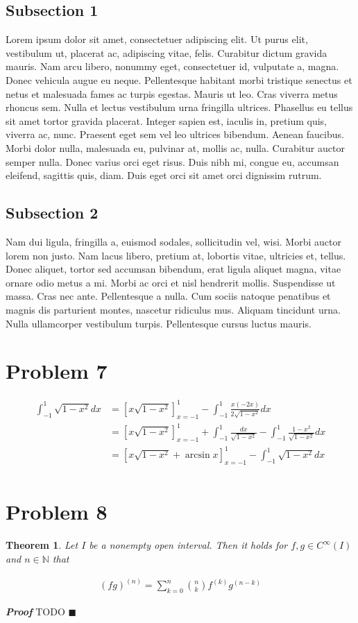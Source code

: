 \documentclass[12pt]{article}
\newtheorem{theorem}{Theorem}
\newenvironment{proof}{\textit{\textbf{Proof}}}{\hfill$\blacksquare$}
\begin{document}
\subsection{Subsection 1}
Lorem ipsum dolor sit amet, consectetuer
adipiscing elit. Ut purus elit, vestibulum ut, placerat ac,
adipiscing vitae, felis. Curabitur dictum gravida mauris. Nam arcu
libero, nonummy eget, consectetuer id, vulputate a, magna. Donec
vehicula augue eu neque. Pellentesque habitant morbi tristique
senectus et netus et malesuada fames ac turpis egestas. Mauris ut
leo. Cras viverra metus rhoncus sem. Nulla et lectus vestibulum urna
fringilla ultrices.  Phasellus eu tellus sit amet tortor gravida
placerat. Integer sapien est, iaculis in, pretium quis, viverra ac,
nunc. Praesent eget sem vel leo ultrices bibendum. Aenean faucibus.
Morbi dolor nulla, malesuada eu, pulvinar at, mollis ac, nulla.
Curabitur auctor semper nulla. Donec varius orci eget risus. Duis
nibh mi, congue eu, accumsan eleifend, sagittis quis, diam. Duis
eget orci sit amet orci dignissim rutrum.

\subsection{Subsection 2}
Nam dui ligula, fringilla a, euismod sodales,
sollicitudin vel, wisi. Morbi auctor lorem non justo. Nam lacus
libero, pretium at, lobortis vitae, ultricies et, tellus. Donec
aliquet, tortor sed accumsan bibendum, erat ligula aliquet magna,
vitae ornare odio metus a mi. Morbi ac orci et nisl hendrerit
mollis. Suspendisse ut massa. Cras nec ante. Pellentesque a nulla.
Cum sociis natoque penatibus et magnis dis parturient montes,
nascetur ridiculus mus. Aliquam tincidunt urna. Nulla ullamcorper
vestibulum turpis. Pellentesque cursus luctus mauris.

\section{Problem 7}
\begin{align*}
	\int_{-1}^{1}\sqrt{1-x^2}dx &= \left[x\sqrt{1-x^2} \right]_{x=-1}^{1} - \int_{-1}^{1}\frac{x(-2x)}{2\sqrt{1-x^2}}dx \\
	&= \left[x\sqrt{1-x^2} \right]_{x=-1}^{1} + \int_{-1}^{1}\frac{dx}{\sqrt{1-x^2}} - \int_{-1}^{1}\frac{1-x^2}{\sqrt{1-x^2}}dx \\
	&= \left[x\sqrt{1-x^2} + \arcsin x \right]_{x=-1}^{1} - \int_{-1}^{1}\sqrt{1-x^2}dx \\
\end{align*}

\section*{Problem 8}
\begin{theorem}
	Let $I$ be a nonempty open interval. Then it holds for $f, g \in C^\infty(I)$ and $n \in \mathbb{N}$ that
	
	\begin{align*}
		(fg)^{(n)} = \sum_{k=0}^{n}\binom{n}{k} f^{(k)}g^{(n-k)}
	\end{align*}
\end{theorem}

\begin{proof}
	TODO
\end{proof}

\printindex
\end{document}
